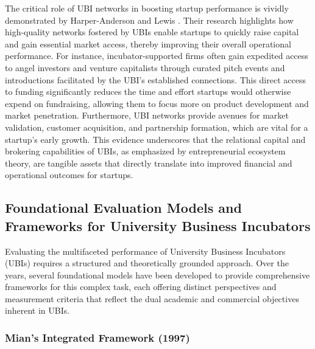 \documentclass[../Main.tex]{subfiles}
\begin{document}
The critical role of UBI networks in boosting startup performance is vividly demonstrated by Harper-Anderson and Lewis \autocite{harper2018makes}. Their research highlights how high-quality networks fostered by UBIs enable startups to quickly raise capital and gain essential market access, thereby improving their overall operational performance. For instance, incubator-supported firms often gain expedited access to angel investors and venture capitalists through curated pitch events and introductions facilitated by the UBI's established connections. This direct access to funding significantly reduces the time and effort startups would otherwise expend on fundraising, allowing them to focus more on product development and market penetration. Furthermore, UBI networks provide avenues for market validation, customer acquisition, and partnership formation, which are vital for a startup's early growth. This evidence underscores that the relational capital and brokering capabilities of UBIs, as emphasized by entrepreneurial ecosystem theory, are tangible assets that directly translate into improved financial and operational outcomes for startups.

\subsection{Foundational Evaluation Models and Frameworks for University Business Incubators}

Evaluating the multifaceted performance of University Business Incubators (UBIs) requires a structured and theoretically grounded approach. Over the years, several foundational models have been developed to provide comprehensive frameworks for this complex task, each offering distinct perspectives and measurement criteria that reflect the dual academic and commercial objectives inherent in UBIs.

\subsubsection{Mian's Integrated Framework (1997)}
\end{document}
